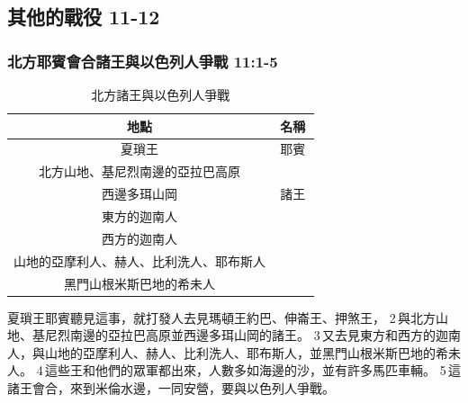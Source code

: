 \subsection{其他的戰役 11-12 }

\subsubsection{北方耶賓會合諸王與以色列人爭戰 11:1-5}
\begin{table}[H]
\centering
\begin{tabular}{|c|c|}
\hline
\hline
地點 & 名稱  \\\hline
夏瑣王 & 耶賓 \\\hline
北方山地、基尼烈南邊的亞拉巴高原&   \\\hline
西邊多珥山岡&諸王  \\\hline
東方的迦南人&　 　\\\hline
西方的迦南人& 　\\\hline
山地的亞摩利人、赫人、比利洗人、耶布斯人& 　\\\hline
黑門山根米斯巴地的希未人& 　\\\hline
\end{tabular}
\caption{北方諸王與以色列人爭戰}
\end{table}
夏瑣王耶賓聽見這事，就打發人去見瑪頓王約巴、伸崙王、押煞王， 2 與北方山地、基尼烈南邊的亞拉巴高原並西邊多珥山岡的諸王。 3 又去見東方和西方的迦南人，與山地的亞摩利人、赫人、比利洗人、耶布斯人，並黑門山根米斯巴地的希未人。 4 這些王和他們的眾軍都出來，人數多如海邊的沙，並有許多馬匹車輛。 5 這諸王會合，來到米倫水邊，一同安營，要與以色列人爭戰。

